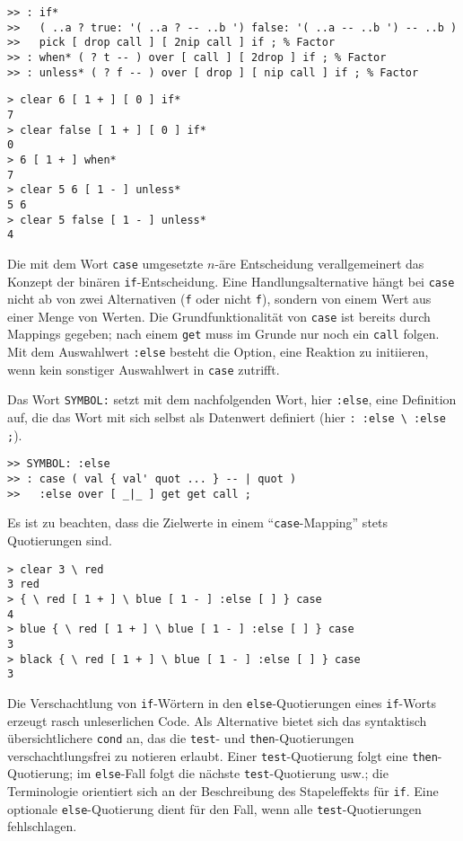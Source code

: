\begin{verbatim}
>> : if*
>>   ( ..a ? true: '( ..a ? -- ..b ') false: '( ..a -- ..b ') -- ..b )
>>   pick [ drop call ] [ 2nip call ] if ; % Factor
>> : when* ( ? t -- ) over [ call ] [ 2drop ] if ; % Factor
>> : unless* ( ? f -- ) over [ drop ] [ nip call ] if ; % Factor
\end{verbatim}

\begin{verbatim}
> clear 6 [ 1 + ] [ 0 ] if*
7
> clear false [ 1 + ] [ 0 ] if*
0
> 6 [ 1 + ] when*
7
> clear 5 6 [ 1 - ] unless*
5 6
> clear 5 false [ 1 - ] unless*
4
\end{verbatim}

Die mit dem Wort \verb|case| umgesetzte $n$-äre Entscheidung verallgemeinert das Konzept der binären \verb|if|-Entscheidung. Eine Handlungsalternative hängt bei \verb|case| nicht ab von zwei Alternativen (\verb|f| oder nicht \verb|f|), sondern von einem Wert aus einer Menge von Werten. Die Grundfunktionalität von \verb|case| ist bereits durch Mappings gegeben; nach einem \verb|get| muss im Grunde nur noch ein \verb|call| folgen. Mit dem Auswahlwert \verb|:else| besteht die Option, eine Reaktion zu initiieren, wenn kein sonstiger Auswahlwert in \verb|case| zutrifft.

Das Wort \verb|SYMBOL:| setzt mit dem nachfolgenden Wort, hier \verb|:else|, eine Definition auf, die das Wort mit sich selbst als Datenwert definiert (hier \verb|: :else \ :else ;|).

\begin{verbatim}
>> SYMBOL: :else 
>> : case ( val { val' quot ... } -- | quot )
>>   :else over [ _|_ ] get get call ;
\end{verbatim}

Es ist zu beachten, dass die Zielwerte in einem "`\verb|case|-Mapping"' stets Quotierungen sind.

\begin{verbatim}
> clear 3 \ red
3 red
> { \ red [ 1 + ] \ blue [ 1 - ] :else [ ] } case
4
> blue { \ red [ 1 + ] \ blue [ 1 - ] :else [ ] } case
3
> black { \ red [ 1 + ] \ blue [ 1 - ] :else [ ] } case
3
\end{verbatim}

Die Verschachtlung von \verb|if|-Wörtern in den \verb|else|-Quotierungen eines \verb|if|-Worts erzeugt rasch unleserlichen Code. Als Alternative bietet sich das syntaktisch übersichtlichere \verb|cond| an, das die \verb|test|- und \verb|then|-Quo\-tie\-run\-gen verschachtlungsfrei zu notieren erlaubt. Einer \verb|test|-Quotierung folgt eine \verb|then|-Quotierung; im \verb|else|-Fall folgt die nächste \verb|test|-Quotierung usw.; die Terminologie orientiert sich an der Beschreibung des Stapeleffekts für \verb|if|. Eine optionale \verb|else|-Quotierung dient für den Fall, wenn alle \verb|test|-Quotierungen fehlschlagen.

